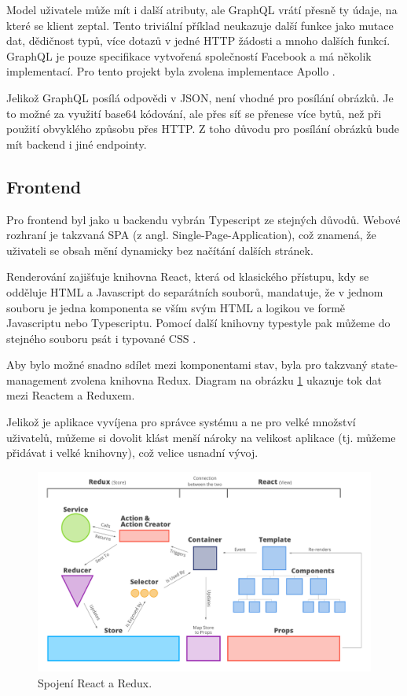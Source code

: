 Model uživatele může mít i další atributy, ale GraphQL vrátí přesně ty údaje, na které se klient zeptal.
Tento triviální příklad neukazuje další funkce jako mutace dat, dědičnost typů, více dotazů v jedné HTTP žádosti
a mnoho dalších funkcí.
GraphQL je pouze specifikace vytvořená společností Facebook a má několik
implementací. \citep[viz][]{GraphQLDoc} Pro tento projekt byla zvolena implementace Apollo \citep[viz][]{Apollo}.

Jelikož GraphQL posílá odpovědi v JSON, není vhodné pro posílání obrázků. Je to možné za využití base64 kódování,
ale přes síť se přenese více bytů, než při použití obvyklého způsobu přes HTTP. Z toho důvodu pro posílání
obrázků bude mít backend i jiné endpointy.

\subsection{Frontend} \label{frontend}

Pro frontend byl jako u backendu vybrán Typescript ze stejných důvodů. Webové rozhraní
je takzvaná SPA (z angl. Single-Page-Application), což znamená, že uživateli se obsah mění dynamicky
bez načítání dalších stránek.

Renderování zajišťuje knihovna React, která od klasického přístupu, kdy se odděluje HTML a Javascript do separátních
souborů, mandatuje, že v jednom souboru je jedna komponenta se vším svým HTML a logikou ve formě Javascriptu nebo
Typescriptu. \citep[viz][]{Reactjs}
Pomocí další knihovny typestyle pak můžeme do stejného souboru psát i typované CSS \citep[viz][]{typestyle}.

Aby bylo možné snadno sdílet mezi komponentami stav, byla pro takzvaný state-management zvolena knihovna Redux.
\citep[viz][]{ReduxCore}
Diagram na obrázku \ref{fig:react_redux_dataflow} ukazuje tok dat mezi Reactem a Reduxem.

Jelikož je aplikace vyvíjena pro správce systému a ne pro velké množství uživatelů, můžeme si dovolit
klást menší nároky na velikost aplikace (tj. můžeme přidávat i velké knihovny), což velice usnadní vývoj.

\begin{figure}[!htb] \centering
\includegraphics[width=145mm]{../img/react-redux-architecture.png}
\caption{Spojení React a Redux. \citep[viz][]{react_redux_dataflow}}
\label{fig:react_redux_dataflow}
\end{figure}

